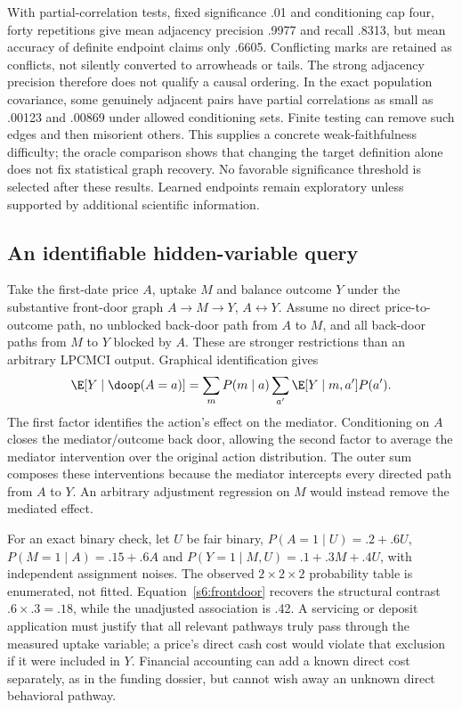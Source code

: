 With partial-correlation tests, fixed significance .01 and conditioning cap
four, forty repetitions give mean adjacency precision .9977 and recall
.8313, but mean accuracy of definite endpoint claims only .6605. Conflicting
marks are retained as conflicts, not silently converted to arrowheads or
tails. The strong adjacency precision therefore does not qualify a causal
ordering. In the exact population covariance, some genuinely adjacent pairs
have partial correlations as small as .00123 and .00869 under allowed
conditioning sets. Finite testing can remove such edges and then misorient
others. This supplies a concrete weak-faithfulness difficulty; the oracle
comparison shows that changing the target definition alone does not fix
statistical graph recovery. No favorable significance threshold is selected
after these results. Learned endpoints remain exploratory unless supported
by additional scientific information.

\subsection{An identifiable hidden-variable query}
Take the first-date price $A$, uptake $M$ and balance outcome $Y$ under the
substantive front-door graph $A\to M\to Y$, $A\leftrightarrow Y$.
Assume no direct price-to-outcome path, no unblocked back-door path from
$A$ to $M$, and all back-door paths from $M$ to $Y$ blocked by $A$.
These are stronger restrictions than an arbitrary LPCMCI output. Graphical
identification gives \citep{pearl2009,id2006}
\begin{equation}
 \E[Y\mid\doop(A=a)]
 =\sum_mP(m\mid a)\sum_{a'}\E[Y\mid m,a']P(a').
 \label{s6:frontdoor}
\end{equation}
The first factor identifies the action's effect on the mediator. Conditioning
on $A$ closes the mediator/outcome back door, allowing the second factor to
average the mediator intervention over the original action distribution.
The outer sum composes these interventions because the mediator intercepts
every directed path from $A$ to $Y$. An arbitrary adjustment regression on
$M$ would instead remove the mediated effect.

For an exact binary check, let $U$ be fair binary,
$P(A=1\mid U)=.2+.6U$, $P(M=1\mid A)=.15+.6A$ and
$P(Y=1\mid M,U)=.1+.3M+.4U$, with independent assignment noises.
The observed $2\times2\times2$ probability table is enumerated, not fitted.
Equation~\eqref{s6:frontdoor} recovers the structural contrast
$.6\times.3=.18$, while the unadjusted association is .42. A servicing or
deposit application must justify that all relevant pathways truly pass
through the measured uptake variable; a price's direct cash cost would
violate that exclusion if it were included in $Y$. Financial accounting can
add a known direct cost separately, as in the funding dossier, but cannot
wish away an unknown direct behavioral pathway.

